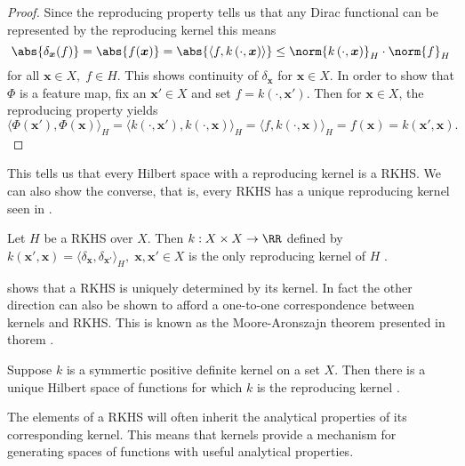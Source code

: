 \begin{proof}
    Since the reproducing property tells us that any Dirac functional can be represented by the reproducing kernel this means
    \[
        \abs{\delta_{\bm{x}} (f)} = \abs{f(\bm{x})} = \abs{\langle f , k \left( \cdot, \bm{x} \right) \rangle} \leq \norm{k \left( \cdot, \bm{x} \right)}_H \cdot \norm{f}_H
    \]
    for all $\bm{x} \in X, \; f \in H$. This shows continuity of $\delta_{\bm{x}}$ for $\bm{x} \in X$. In order to show that $\Phi$ is a feature map, fix an $\bm{x}' \in X$ and set $f = k \left( \cdot, \bm{x}' \right)$. Then for $\bm{x} \in X$, the reproducing property yields
    \[
        \langle \Phi (\bm{x}') , \Phi (\bm{x}) \rangle_H = \langle k \left( \cdot, \bm{x}' \right) , k \left( \cdot, \bm{x} \right) \rangle_H = \langle f , k \left( \cdot, \bm{x} \right) \rangle_H = f(\bm{x}) = k \left( \bm{x}', \bm{x} \right).
    \]
\end{proof}

This tells us that every Hilbert space with a reproducing kernel is a RKHS. We can also show the converse, that is, every RKHS has a unique reproducing kernel seen in .

\begin{thm} \label{theorem: unique_kernel}
    Let $H$ be a RKHS over $X$. Then $k: X \times X \to \RR$ defined by $k \left( \bm{x}', \bm{x} \right) = \langle \delta_{\bm{x}} , \delta_{\bm{x}'} \rangle_H, \; \bm{x} , \bm{x}' \in X$ is the only reproducing kernel of $H$ \cite{SteinwartIngo2008SVMb}.
\end{thm}

 shows that a RKHS is uniquely determined by its kernel. In fact the other direction can also be shown to afford a one-to-one correspondence between kernels and RKHS. This is known as the Moore-Aronszajn theorem presented in thorem .

\begin{thm} \label{theorem: Moore-Aronszajn}
    Suppose $k$ is a symmertic positive definite kernel on a set $X$. Then there is a unique Hilbert space of functions for which $k$ is the reproducing kernel \cite{BerlinetAlain2003RKHS}.
\end{thm}

The elements of a RKHS will often inherit the analytical properties of its corresponding kernel. This means that kernels provide a mechanism for generating spaces of functions with useful analytical properties.